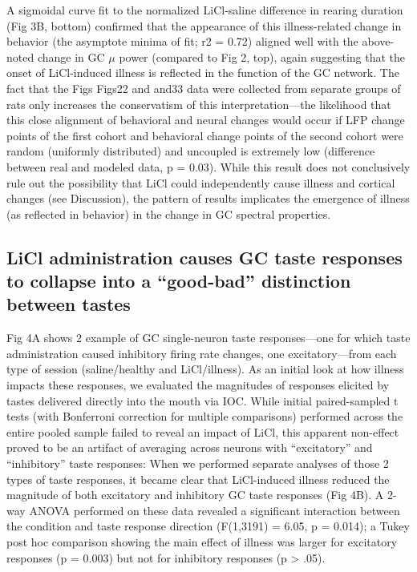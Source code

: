 \begin{refsection}
{A sigmoidal curve fit to the normalized LiCl-saline difference in rearing duration (Fig 3B, bottom) confirmed that the appearance of this illness-related change in behavior (the asymptote minima of fit; r2 = 0.72) aligned well with the above-noted change in GC \(\mu\) power (compared to Fig 2, top), again suggesting that the onset of LiCl-induced illness is reflected in the function of the GC network. The fact that the Figs ​Figs22 and ​and33 data were collected from separate groups of rats only increases the conservatism of this interpretation—the likelihood that this close alignment of behavioral and neural changes would occur if LFP change points of the first cohort and behavioral change points of the second cohort were random (uniformly distributed) and uncoupled is extremely low (difference between real and modeled data, p = 0.03). While this result does not conclusively rule out the possibility that LiCl could independently cause illness and cortical changes (see Discussion), the pattern of results implicates the emergence of illness (as reflected in behavior) in the change in GC spectral properties.

\subsection{LiCl administration causes GC taste responses to collapse into a “good-bad” distinction between tastes}
Fig 4A shows 2 example of GC single-neuron taste responses—one for which taste administration caused inhibitory firing rate changes, one excitatory—from each type of session (saline/healthy and LiCl/illness). As an initial look at how illness impacts these responses, we evaluated the magnitudes of responses elicited by tastes delivered directly into the mouth via IOC. While initial paired-sampled t tests (with Bonferroni correction for multiple comparisons) performed across the entire pooled sample failed to reveal an impact of LiCl, this apparent non-effect proved to be an artifact of averaging across neurons with “excitatory” and “inhibitory” taste responses: When we performed separate analyses of those 2 types of taste responses, it became clear that LiCl-induced illness reduced the magnitude of both excitatory and inhibitory GC taste responses (Fig 4B). A 2-way ANOVA performed on these data revealed a significant interaction between the condition and taste response direction (F(1,3191) = 6.05, p = 0.014); a Tukey post hoc comparison showing the main effect of illness was larger for excitatory responses (p = 0.003) but not for inhibitory responses (p > .05).


}
\end{refsection}
